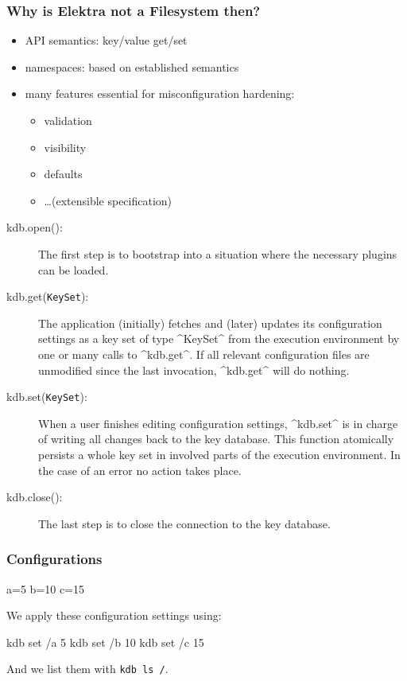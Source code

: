 \begin{frame}
	\frametitle{Why is Elektra not a Filesystem then?}
	\begin{itemize}
	\item API semantics: key/value get/set
	\item namespaces: based on established semantics
	\item many features essential for misconfiguration hardening:
		\begin{itemize}
		\item validation
		\item visibility
		\item defaults
		\item \dots (extensible specification)
		\end{itemize}
	\end{itemize}
\end{frame}


\begin{frame}[fragile]
	\begin{description}
	\item[kdb.open():]
	The first step is to bootstrap into a situation where the necessary plugins can be loaded.
	\item[kdb.get(\texttt{KeySet}):] 
	The application (initially) fetches and (later) updates its configuration settings as a key set of type ^KeySet^ from the execution environment by one or many calls to ^kdb.get^.
	If all relevant configuration files are unmodified since the last invocation, ^kdb.get^ will do nothing.
	\item[kdb.set(\texttt{KeySet}):] 
	When a user finishes editing configuration settings, ^kdb.set^ is in charge of writing all changes back to the key database.
	This function atomically persists a whole key set in involved parts of the execution environment.
	In the case of an error no action takes place.
	\item[kdb.close():] 
	The last step is to close the connection to the key database.
	\end{description}
\end{frame}

\begin{frame}[fragile]
	\frametitle{Configurations}
	\begin{code}[language=CfgElektra]
	a=5
	b=10
	c=15
	\end{code}

	We apply these configuration settings using:

	\begin{code}[language=bash]
	kdb set /a 5
	kdb set /b 10
	kdb set /c 15
	\end{code}

	And we list them with \lstinline[language=bash,morekeywords={ls},showspaces=no]^kdb ls /^.
\end{frame}

